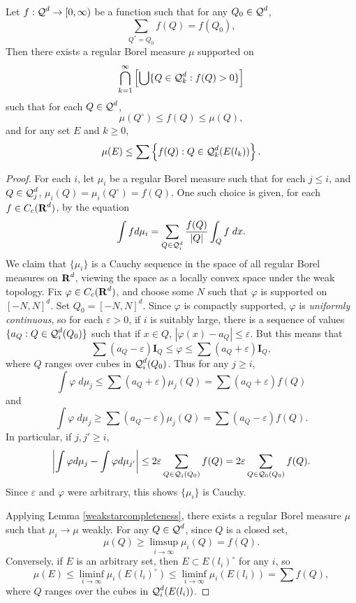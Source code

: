 \begin{theorem} \label{massdistributionprinciplelem}
	Let $f: \operatorname{\mathcal{Q}}^d \to [0,\infty)$ be a function such that for any $Q_0 \in \operatorname{\mathcal{Q}}^d$,
	\begin{equation} \label{equation73234091} \sum_{Q^* = Q_0} f(Q) = f(Q_0), \end{equation}
	Then there exists a regular Borel measure $\mu$ supported on
	\[ \bigcap_{k = 1}^\infty \left[ \bigcup \{ Q \in \operatorname{\mathcal{Q}}_k^d : f(Q) > 0 \} \right] \]
	such that for each $Q \in \operatorname{\mathcal{Q}}^d$,
	\begin{equation} \label{massdissupperbound} \mu(Q^\circ) \leq f(Q) \leq \mu(Q), \end{equation}
	and for any set $E$ and $k \geq 0$,
	\begin{equation} \label{massdisslowerbound} \mu(E) \leq \sum \left\{ f(Q) : Q \in \operatorname{\mathcal{Q}}^d_k(E(l_k)) \right\}. \end{equation}
\end{theorem}
\begin{proof}
	For each $i$, let $\mu_i$ be a regular Borel measure such that for each $j \leq i$, and $Q \in \operatorname{\mathcal{Q}}_j^d$, $\mu_i(Q) = \mu_i(Q^\circ) = f(Q)$. One such choice is given, for each $f \in C_c(\operatorname{\mathbf{R}}^d)$, by the equation
	\[ \int f d\mu_i = \sum_{Q \in \operatorname{\mathcal{Q}}_i^d} \frac{f(Q)}{|Q|} \int_Q f\; dx. \]
	We claim that $\{ \mu_i \}$ is a Cauchy sequence in the space of all regular Borel measures on $\operatorname{\mathbf{R}}^d$, viewing the space as a locally convex space under the weak topology. Fix $\varphi \in C_c(\operatorname{\mathbf{R}}^d)$, and choose some $N$ such that $\varphi$ is supported on $[-N,N]^d$. Set $Q_0 = [-N,N]^d$. Since $\varphi$ is compactly supported, $\varphi$ is \emph{uniformly continuous}, so for each $\varepsilon > 0$, if $i$ is suitably large, there is a sequence of values $\{ a_Q : Q \in \operatorname{\mathcal{Q}}_i^d(Q_0) \}$ such that if $x \in Q$, $|\varphi(x) - a_Q| \leq \varepsilon$. But this means that
	\[ \sum (a_Q - \varepsilon) \mathbf{I}_Q \leq \varphi \leq \sum (a_Q + \varepsilon) \mathbf{I}_Q, \]
	where $Q$ ranges over cubes in $\operatorname{\mathcal{Q}}_i^d(Q_0)$. Thus for any $j \geq i$,
	\[ \int \varphi\; d\mu_j\leq \sum (a_Q + \varepsilon) \mu_j(Q) = \sum (a_Q + \varepsilon) f(Q) \]
	and
	\[ \int \varphi\; d\mu_j \geq \sum (a_Q - \varepsilon) \mu_j(Q) = \sum (a_Q - \varepsilon) f(Q). \]
	In particular, if $j,j' \geq i$,
	\[ \left| \int \varphi d\mu_j - \int \varphi d\mu_{j'} \right| \leq 2 \varepsilon \sum_{Q \in \operatorname{\mathcal{Q}}_i(Q_0)} f(Q) = 2\varepsilon \sum_{Q \in \operatorname{\mathcal{Q}}_0(Q_0)} f(Q). \]
	Since $\varepsilon$ and $\varphi$ were arbitrary, this shows $\{ \mu_i \}$ is Cauchy.

	Applying Lemma \ref{weakstarcompleteness}, there exists a regular Borel measure $\mu$ such that $\mu_i \to \mu$ weakly. For any $Q \in \operatorname{\mathcal{Q}}^d$, since $Q$ is a closed set,
	\[ \mu(Q) \geq \limsup_{i \to \infty} \mu_i(Q) = f(Q). \]
	Conversely, if $E$ is an arbitrary set, then $E \subset E(l_i)^\circ$ for any $i$, so
	\[ \mu(E) \leq \liminf_{i \to \infty} \mu_i(E(l_i)^\circ) \leq \liminf_{i \to \infty} \mu_i(E(l_i)) = \sum f(Q), \]
	where $Q$ ranges over the cubes in $\operatorname{\mathcal{Q}}_i^d(E(l_i))$.
\end{proof}

